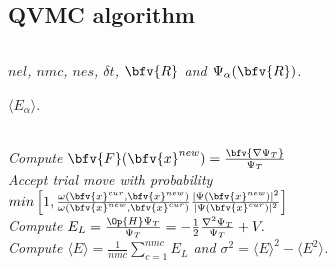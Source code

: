 \subsection{QVMC algorithm}

\begin{frame}[fragile]
	\begin{scriptsize}
	\begin{columns}%
		\column{6cm}
		\begin{algorithmic}%
			\medskip
			\REQUIRE \emph{$nel$, $nmc$, $nes$, $\delta t$, $\bfv{R}$ and $\Psi_{\alpha}(\bfv{R})$.}

			\ENSURE $\langle E_{\alpha} \rangle$.

					\\
					\medskip
					\emph{Compute $\bfv{F}(\bfv{x}^{new}) = \frac{\bfv{\nabla \Psi_T}}{\Psi_T}$}\\
					\emph{Accept trial move with probability}\\
					$min\left[1,\frac{\omega(\bfv{x}^{cur}, \bfv{x}^{new})}{\omega(\bfv{x}^{new}, \bfv{x}^{cur})} {\frac{|\Psi(\bfv{x}^{new})|^2}{|\Psi(\bfv{x}^{cur})|^2}}\right]$
				\ENDFOR
				\\
				\emph{Compute $E_L = \frac{\Op{H}\Psi_T}{\Psi_T} = -\frac{1}{2}\frac{\nabla^2 \Psi_T}{\Psi_T} + V.$}
			\ENDFOR
			\\
			\emph{Compute $\langle E \rangle = \frac{1}{nmc} \sum_{c=1}^{nmc} E_L$ and $\sigma^2 = \langle E \rangle^2- \langle E^2 \rangle$.}
		\end{algorithmic}\label{RSDalgo}
		
		\column{4cm}
		\begin{figure}
			\centering
		\scalebox{0.35}{}
		\end{figure}
	\end{columns}
	\end{scriptsize}
\end{frame}


